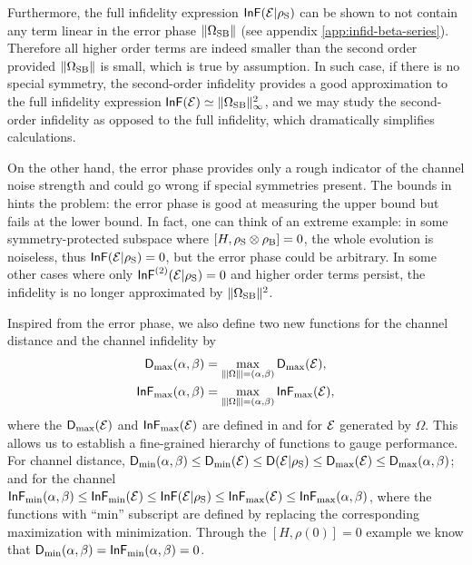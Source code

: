 \documentclass[pra,reprint,superscriptaddress]{revtex4-2}
\begin{document}
Furthermore, the full infidelity expression $\operatorname{\mathsf{InF}}(\mathcal{E}|\rho_{\mathrm{S}})$ can be shown to not contain any term linear in the error phase $\Vert {\Omega_{\mathrm{SB}}} \Vert$  (see appendix \ref{app:infid-beta-series}). Therefore all higher order terms are indeed smaller than the second order provided $\Vert {\Omega_{\mathrm{SB}}} \Vert$ is small,
which is true by assumption. 
In such case, if there is no special symmetry, the second-order infidelity provides a good approximation to the full infidelity expression $\operatorname{\mathsf{InF}}(\mathcal{E})\simeq \Vert {\Omega_{\mathrm{SB}}} \Vert_\infty^2$, and we may study the second-order infidelity as opposed to the full infidelity, which dramatically simplifies  calculations.

On the other hand, the error phase provides only a rough indicator of the 
channel noise strength and could go wrong if special symmetries present.
The bounds in  hints the problem: the error phase is good at measuring the upper bound but fails at the lower bound. 
In fact, one can think of an extreme example: in some symmetry-protected subspace where $[H,\rho_\mathrm{S}\otimes\rho_\mathrm{B}]=0$, the whole evolution is noiseless, 
thus $\operatorname{\mathsf{InF}}(\mathcal{E}|\rho_\mathrm{S})=0$, but the error phase could be arbitrary. In some other cases where only $\operatorname{\mathsf{InF}}^{(2)}(\mathcal{E}|\rho_{\mathrm{S}}) = 0$ and higher order terms persist, the infidelity is no longer approximated by $\Vert {\Omega_{\mathrm{SB}}} \Vert^2$.

Inspired from the error phase, we also define two new functions for the channel distance and the channel infidelity by 
\begin{align}
    \trdis_{\max}(\alpha,\beta)&= \max_{\opnorm{\Omega}=(\alpha,\beta)}\trdis_{\max}(\cE),\\
    \infid_{\max}(\alpha,\beta)&= \max_{\opnorm{\Omega}=(\alpha,\beta)}\infid_{\max}(\cE),
\end{align}
where the $\operatorname{\mathsf{D}}_{\max}(\mathcal{E})$ and $\operatorname{\mathsf{InF}}_{\max}(\mathcal{E})$ are defined in  and  for 
$\mathcal{E}$ generated by $\Omega$.
This allows us to establish a fine-grained hierarchy of functions to gauge performance. For channel distance, $\operatorname{\mathsf{D}}_{\min}(\alpha,\beta) \le  \operatorname{\mathsf{D}}_{\min}(\mathcal{E}) \le \operatorname{\mathsf{D}}(\mathcal{E}|\rho_{\mathrm{S}}) \le \operatorname{\mathsf{D}}_{\max}(\mathcal{E}) \le  \operatorname{\mathsf{D}}_{\max}(\alpha,\beta)$;
 and for the channel $\operatorname{\mathsf{InF}}_{\min}(\alpha,\beta) \le  \operatorname{\mathsf{InF}}_{\min}(\mathcal{E}) \le \operatorname{\mathsf{InF}}(\mathcal{E}|\rho_{\mathrm{S}}) \le \operatorname{\mathsf{InF}}_{\max}(\mathcal{E}) \le  \operatorname{\mathsf{InF}}_{\max}(\alpha,\beta)$,
where  the functions with ``min'' subscript are defined by replacing the corresponding maximization with minimization. 
Through the $[H,\rho(0)]=0$ example we know that 
$\operatorname{\mathsf{D}}_{\min}(\alpha,\beta) = \operatorname{\mathsf{InF}}_{\min}(\alpha,\beta) =0$.
\end{document}
